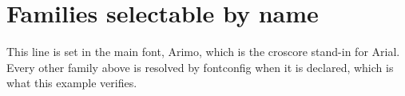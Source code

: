 \documentclass{article}
\begin{document}
\section*{Families selectable by name}

This line is set in the main font, Arimo, which is the croscore stand-in for
Arial. Every other family above is resolved by fontconfig when it is declared,
which is what this example verifies.
\end{document}
